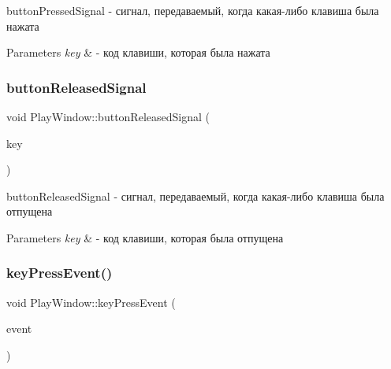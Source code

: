 button\+Pressed\+Signal -\/ сигнал, передаваемый, когда какая-\/либо клавиша была нажата 


\begin{DoxyParams}{Parameters}
{\em key} & -\/ код клавиши, которая была нажата \\
\hline
\end{DoxyParams}
\mbox{\label{class_play_window_a4cc0e9d4e067da86aaf025c2863da5d6}} 
\subsubsection{\texorpdfstring{button\+Released\+Signal}{buttonReleasedSignal}}
{\footnotesize\ttfamily void Play\+Window\+::button\+Released\+Signal (\begin{DoxyParamCaption}\item[{Q\+Char}]{key }\end{DoxyParamCaption})\hspace{0.3cm}{\ttfamily [signal]}}



button\+Released\+Signal -\/ сигнал, передаваемый, когда какая-\/либо клавиша была отпущена 


\begin{DoxyParams}{Parameters}
{\em key} & -\/ код клавиши, которая была отпущена \\
\hline
\end{DoxyParams}
\mbox{\label{class_play_window_aa931ee4edcea15ecb535c45db914fd83}} 
\subsubsection{\texorpdfstring{key\+Press\+Event()}{keyPressEvent()}}
{\footnotesize\ttfamily void Play\+Window\+::key\+Press\+Event (\begin{DoxyParamCaption}\item[{Q\+Key\+Event $\ast$}]{event }\end{DoxyParamCaption})\hspace{0.3cm}{\ttfamily [protected]}}



